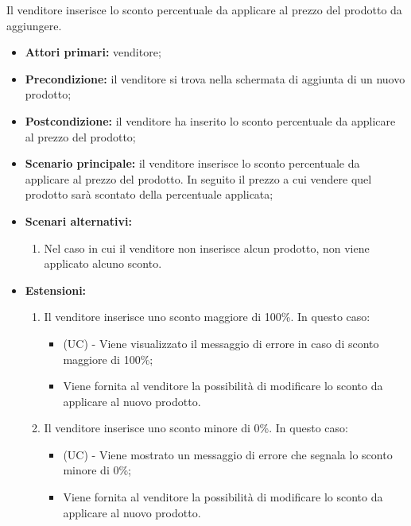 Il venditore inserisce lo sconto percentuale da applicare al prezzo del prodotto da aggiungere.
\begin{itemize}
    \item \textbf{Attori primari:} venditore;
    \item \textbf{Precondizione:} il venditore si trova nella schermata di aggiunta di un nuovo prodotto;
    \item \textbf{Postcondizione:} il venditore ha inserito lo sconto percentuale da applicare al prezzo del prodotto;
    \item \textbf{Scenario principale:} il venditore inserisce lo sconto percentuale da applicare al prezzo del prodotto. In seguito il prezzo a cui vendere quel prodotto sarà scontato della percentuale applicata;
    \item \textbf{Scenari alternativi:}
    \begin{enumerate}[label=\lett]
    	\item Nel caso in cui il venditore non inserisce alcun prodotto, non viene applicato alcuno sconto.
    \end{enumerate}
    \item \textbf{Estensioni:}
    \begin{enumerate}[label=\lett]
    	\item Il venditore inserisce uno sconto maggiore di 100\%. In questo caso:
    	\begin{itemize}
    		\item (UC) - Viene visualizzato il messaggio di errore in caso di sconto maggiore di 100\%;
    		\item Viene fornita al venditore la possibilità di modificare lo sconto da applicare al nuovo prodotto.
    	\end{itemize}
    	\item Il venditore inserisce uno sconto minore di 0\%. In questo caso:
    	\begin{itemize}
    		\item (UC) - Viene mostrato un messaggio di errore che segnala lo sconto minore di 0\%; %
    		\item Viene fornita al venditore la possibilità di modificare lo sconto da applicare al nuovo prodotto.
    	\end{itemize}
    \end{enumerate}
\end{itemize}

